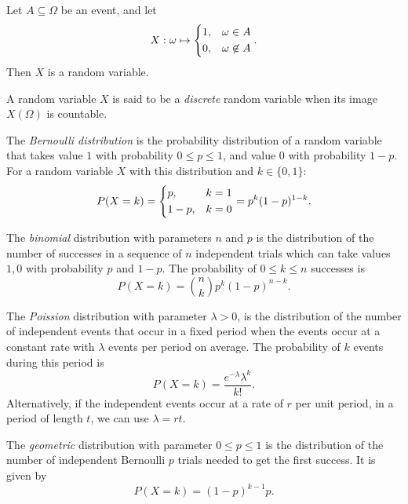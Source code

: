 \begin{exmp}
    Let $A \subseteq \Omega$ be an event, and let
    \[X: \omega \mapsto \begin{dcases}
        1, & \omega \in A \\
        0, & \omega \not\in A
    \end{dcases}.\]
    Then $X$ is a random variable.
\end{exmp}

\begin{defn}
    A random variable $X$ is said to be a \emph{discrete} random variable when its image $X(\Omega)$ is countable.
\end{defn}

\begin{defn}
    The \emph{Bernoulli distribution} is the probability distribution of a random variable that takes value $1$ with probability $0 \leq p \leq 1$, and value $0$ with probability $1 - p$. For a random variable $X$ with this distribution and $k \in \{0, 1\}$:
    \[P(X = k) = \begin{dcases}
        p, & k = 1  \\
        1 - p, & k = 0
    \end{dcases} = p^k(1-p)^{1-k}.\]
\end{defn}

\begin{defn}
    The \emph{binomial} distribution with parameters $n$ and $p$ is the distribution of the number of successes in a sequence of $n$ independent trials which can take values $1, 0$ with probability $p$ and $1 - p$. The probability of $ 0 \leq k \leq n$ successes is
    \[P(X = k) = \binom{n}{k}p^k(1 - p)^{n-k}.\]
\end{defn}

\begin{defn}
    The \emph{Poission} distribution with parameter $\lambda > 0$, is the distribution of the number of independent events that occur in a fixed period when the events occur at a constant rate with $\lambda$ events per period on average. The probability of $k$ events during this period is
    \[P(X = k) = \frac{e^{-\lambda}\lambda^k}{k!}.\]
    Alternatively, if the independent events occur at a rate of $r$ per unit period, in a period of length $t$, we can use $\lambda = rt$.
\end{defn}

\begin{defn}
    The \emph{geometric} distribution with parameter $0 \leq p \leq 1$ is the distribution of the number of independent Bernoulli $p$ trials needed to get the first success. It is given by
    \[P(X = k) = (1-p)^{k-1}p.\]
\end{defn}

